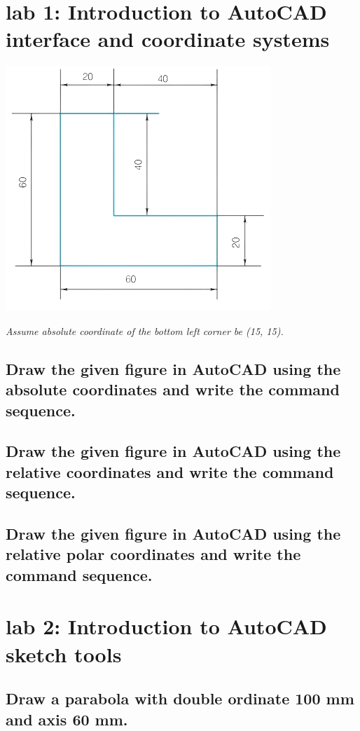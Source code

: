 \documentclass[a4paper, 12pt]{article}
\begin{document}
\section{lab 1: Introduction to AutoCAD interface and coordinate systems}
\begin{center}
	\includegraphics{gfx/fig.png}
\end{center}
\emph{Assume absolute coordinate of the bottom left corner be (15, 15).}
\subsection{Draw the given figure in AutoCAD using the absolute coordinates and write the command sequence.}
\subsection{Draw the given figure in AutoCAD using the relative coordinates and write the command sequence.}
\subsection{Draw the given figure in AutoCAD using the relative polar coordinates and write the command sequence.}
\clearpage
\section{lab 2: Introduction to AutoCAD sketch tools}
\subsection{Draw a parabola with double ordinate 100 mm and axis 60 mm. }
\end{document}
